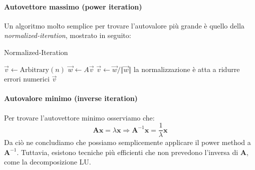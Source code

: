 \documentclass{article}
\begin{document}
        \paragraph{Autovettore massimo (power iteration)}
        Un algoritmo molto semplice per trovare l'autovalore più grande è quello della \emph{normalized-iteration}, 
        mostrato in seguito:
        \begin{algorithm}
            \caption{Normalized-Iteration}
            \label{Normalized-Iteration}
            \begin{algorithmic} %
                    \State $\vec{v} \gets \text{Arbitrary}(n)$
                        \State $\vec{w} \gets A\vec{v}$ 
                        \State $\vec{v} \gets {\vec{w}}/\Vert{\vec{w}}\Vert$ \Comment la normalizzazione è atta a ridurre errori numerici
                    \EndFor
                    \State \Return $\vec{v}$
                \EndFunction
            \end{algorithmic}
        \end{algorithm}

        \paragraph{Autovalore minimo (inverse iteration)}
            Per trovare l'autovettore minimo osserviamo che:
            \[\mathbf{Ax} = \lambda\mathbf{x} \Rightarrow \mathbf{A}^{-1}\mathbf{x} = \frac{1}{\lambda}\mathbf{x}\]
            Da ciò ne concludiamo che possiamo semplicemente applicare il power method a $\mathbf{A}^{-1}$. Tuttavia, esistono 
            tecniche più efficienti che non prevedono l'inversa di $\mathbf{A}$, come la decomposizione LU.
\end{document}
